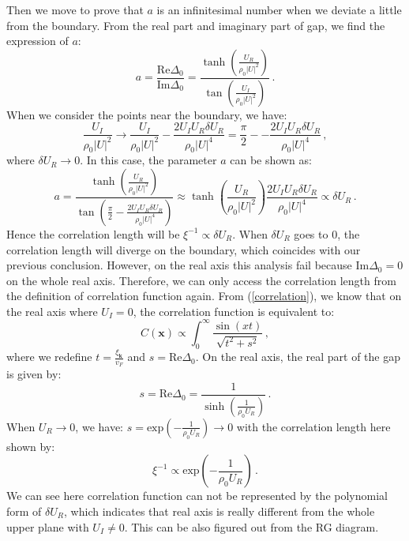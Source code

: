 \documentclass[aps,onecolumn,nofootinbib,superscriptaddress,notitlepage,longbibliography]{revtex4-1}
\begin{document}
Then we move to prove that $a$ is an infinitesimal number when we
deviate a little from the boundary. From the real part and imaginary
part of gap, we find the expression of $a$: 
\begin{equation}
a=\frac{\text{Re}\Delta_{0}}{\text{Im}\Delta_{0}}=\frac{\tanh(\frac{U_{R}}{\rho_{0}|U|^{2}})}{\tan(\frac{U_{I}}{\rho_{0}|U|^{2}})}\,.
\end{equation}
When we consider the points near the boundary, we have: 
\begin{equation}
\frac{U_{I}}{\rho_{0}|U|^{2}}\to\frac{U_{I}}{\rho_{0}|U|^{2}}-\frac{2U_{I}U_{R}\delta U_{R}}{\rho_{0}|U|^{4}}=\frac{\pi}{2}--\frac{2U_{I}U_{R}\delta U_{R}}{\rho_{0}|U|^{4}}\,,
\end{equation}
where $\delta U_{R}\to0$. In this case, the parameter $a$ can be
shown as: 
\begin{equation}
a=\frac{\tanh(\frac{U_{R}}{\rho_{0}|U|^{2}})}{\tan(\frac{\pi}{2}-\frac{2U_{I}U_{R}\delta U_{R}}{\rho_{0}|U|^{4}})}\approx\tanh(\frac{U_{R}}{\rho_{0}|U|^{2}})\frac{2U_{I}U_{R}\delta U_{R}}{\rho_{0}|U|^{4}}\propto\delta U_{R}\,.
\end{equation}
Hence the correlation length will be $\xi^{-1}\propto\delta U_{R}$.
When $\delta U_{R}$ goes to 0, the correlation length will diverge
on the boundary, which coincides with our previous conclusion. However,
on the real axis this analysis fail because $\text{Im}\Delta_{0}=0$
on the whole real axis. Therefore, we can only access the correlation
length from the definition of correlation function again. From (\ref{correlation}),
we know that on the real axis where $U_{I}=0$, the correlation function
is equivalent to: 
\begin{equation}
C(\bm{x})\propto\int_{0}^{\infty}\frac{\sin(xt)}{\sqrt{t^{2}+s^{2}}}\,,
\end{equation}
where we redefine $t=\frac{\xi_{\bm{k}}}{v_{F}}$ and $s=\text{Re}\Delta_{0}$.
On the real axis, the real part of the gap is given by: 
\begin{equation}
s=\text{Re}\Delta_{0}=\frac{1}{\sinh(\frac{1}{\rho_{0}U_{R}})}\,.
\end{equation}
When $U_{R}\to0$, we have: $s=\text{exp}(-\frac{1}{\rho_{0}U_{R}})\to0$
with the correlation length here shown by: 
\begin{equation}
\xi^{-1}\propto\text{exp}(-\frac{1}{\rho_{0}U_{R}})\,.
\end{equation}
We can see here correlation function can not be represented by the
polynomial form of $\delta U_{R}$, which indicates that real axis
is really different from the whole upper plane with $U_{I}\neq0$.
This can be also figured out from the RG diagram.
\end{document}
